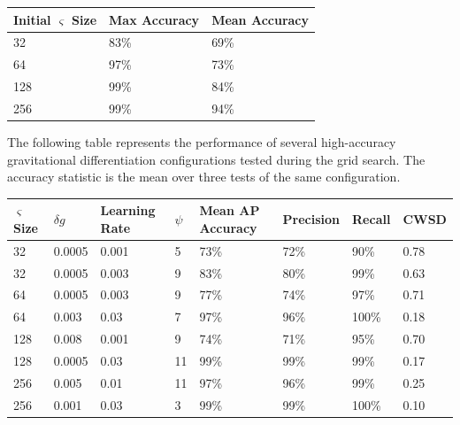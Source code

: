 \documentclass[10pt]{article}
\begin{document}
\begin{minipage}{\textwidth}
    \begin{center}
         \label{grav_accuracy_by_varsigma}
        \begin{tabular}{|l|l|l|}
            \hline
            Initial $\varsigma$ Size & Max Accuracy & Mean Accuracy \\
            \hline
            32 & 83\% & 69\% \\
            \hline
            64 & 97\% & 73\% \\
            \hline
            128 & 99\% & 84\% \\
            \hline
            256 & 99\% & 94\% \\
            \hline
        \end{tabular}
    \end{center}
\end{minipage}

The following table represents the performance of several high-accuracy gravitational differentiation configurations tested during the grid search. The accuracy statistic is the mean over three tests of the same configuration.

\begin{minipage}{\textwidth}
    \begin{center}
        \begin{tabular}{|l|l|l|l|l|l|l|l|}
            \hline
            $\varsigma$ Size & $\delta g$ & Learning Rate & $\psi$ & Mean AP Accuracy & Precision & Recall & CWSD \\
            \hline
            32 & 0.0005 & 0.001 & 5 & 73\% & 72\% & 90\% & 0.78 \\
            \hline
            32 & 0.0005 & 0.003 & 9 & 83\% & 80\% & 99\% & 0.63 \\
            \hline
            64 & 0.0005 & 0.003 & 9 & 77\% & 74\% & 97\% & 0.71 \\
            \hline
            64 & 0.003 & 0.03 & 7 & 97\% & 96\% & 100\% & 0.18 \\
            \hline
            128 & 0.008 & 0.001 & 9 & 74\% & 71\% & 95\% & 0.70 \\
            \hline
            128 & 0.0005 & 0.03 & 11 & 99\% & 99\% & 99\% & 0.17 \\
            \hline
            256 & 0.005 & 0.01 & 11 & 97\% & 96\% & 99\% & 0.25 \\
            \hline
            256 & 0.001 & 0.03 & 3 & 99\% & 99\% & 100\% & 0.10 \\
            \hline
        \end{tabular}
    \end{center}
\end{minipage}
\end{document}
